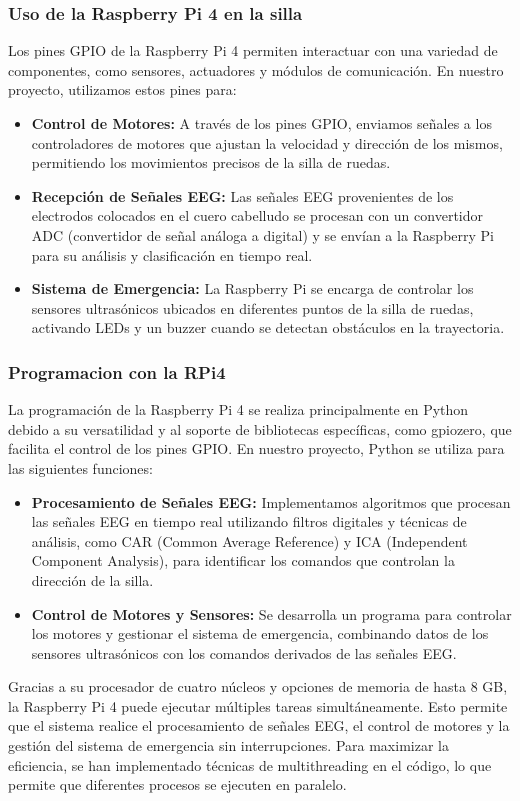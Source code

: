 \documentclass{article}
\begin{document}
\subsubsection{Uso de la Raspberry Pi 4 en la silla}
Los pines GPIO de la Raspberry Pi 4 permiten interactuar con una variedad de componentes, como sensores, actuadores y módulos de comunicación. En nuestro proyecto, utilizamos estos pines para:

\begin{itemize}
    \item \textbf{Control de Motores:} A través de los pines GPIO, enviamos señales a los controladores de motores que ajustan la velocidad y dirección de los mismos, permitiendo los movimientos precisos de la silla de ruedas.
    \item \textbf{Recepción de Señales EEG:} Las señales EEG provenientes de los electrodos colocados en el cuero cabelludo se procesan con un convertidor ADC (convertidor de señal análoga a digital) y se envían a la Raspberry Pi para su análisis y clasificación en tiempo real.
    \item \textbf{Sistema de Emergencia:} La Raspberry Pi se encarga de controlar los sensores ultrasónicos ubicados en diferentes puntos de la silla de ruedas, activando LEDs y un buzzer cuando se detectan obstáculos en la trayectoria.
\end{itemize}

\subsubsection{Programacion con la RPi4}
La programación de la Raspberry Pi 4 se realiza principalmente en Python debido a su versatilidad y al soporte de bibliotecas específicas, como gpiozero, que facilita el control de los pines GPIO. En nuestro proyecto, Python se utiliza para las siguientes funciones:
\begin{itemize}
    \item \textbf{Procesamiento de Señales EEG:} Implementamos algoritmos que procesan las señales EEG en tiempo real utilizando filtros digitales y técnicas de análisis, como CAR (Common Average Reference) y ICA (Independent Component Analysis), para identificar los comandos que controlan la dirección de la silla.
    \item \textbf{Control de Motores y Sensores:} Se desarrolla un programa para controlar los motores y gestionar el sistema de emergencia, combinando datos de los sensores ultrasónicos con los comandos derivados de las señales EEG.
\end{itemize}
Gracias a su procesador de cuatro núcleos y opciones de memoria de hasta 8 GB, la Raspberry Pi 4 puede ejecutar múltiples tareas simultáneamente. Esto permite que el sistema realice el procesamiento de señales EEG, el control de motores y la gestión del sistema de emergencia sin interrupciones. Para maximizar la eficiencia, se han implementado técnicas de multithreading en el código, lo que permite que diferentes procesos se ejecuten en paralelo.
\end{document}
